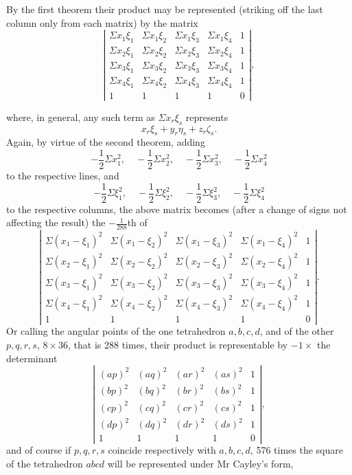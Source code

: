 \documentclass[11pt]{article}
\newcommand{\sourcepage}[1]{\marginpar{\scriptsize p.~#1}}
\begin{document}
{{By the first theorem their product may be represented (striking off the last column only from each matrix) by the matrix
\[
\left|\begin{array}{ccccc}
\Sigma x_1\xi_1&\Sigma x_1\xi_2&\Sigma x_1\xi_3&\Sigma x_1\xi_4&1\\
\Sigma x_2\xi_1&\Sigma x_2\xi_2&\Sigma x_2\xi_3&\Sigma x_2\xi_4&1\\
\Sigma x_3\xi_1&\Sigma x_3\xi_2&\Sigma x_3\xi_3&\Sigma x_3\xi_4&1\\
\Sigma x_4\xi_1&\Sigma x_4\xi_2&\Sigma x_4\xi_3&\Sigma x_4\xi_4&1\\
1&1&1&1&0
\end{array}\right|,
\]

\sourcepage{386}
where, in general, any such term as $\Sigma x_r\xi_s$ represents
\[
x_r\xi_s+y_r\eta_s+z_r\zeta_s.
\]
Again, by virtue of the second theorem, adding
\[
-\frac12\Sigma x_1^2,\quad -\frac12\Sigma x_2^2,\quad
-\frac12\Sigma x_3^2,\quad -\frac12\Sigma x_4^2
\]
to the respective lines, and
\[
-\frac12\Sigma \xi_1^2,\quad -\frac12\Sigma \xi_2^2,\quad
-\frac12\Sigma \xi_3^2,\quad -\frac12\Sigma \xi_4^2
\]
to the respective columns, the above matrix becomes (after a change of signs not affecting the result) the $-\frac1{288}$th of
\[
\left|\begin{array}{ccccc}
\Sigma(x_1-\xi_1)^2&\Sigma(x_1-\xi_2)^2&\Sigma(x_1-\xi_3)^2&\Sigma(x_1-\xi_4)^2&1\\
\Sigma(x_2-\xi_1)^2&\Sigma(x_2-\xi_2)^2&\Sigma(x_2-\xi_3)^2&\Sigma(x_2-\xi_4)^2&1\\
\Sigma(x_3-\xi_1)^2&\Sigma(x_3-\xi_2)^2&\Sigma(x_3-\xi_3)^2&\Sigma(x_3-\xi_4)^2&1\\
\Sigma(x_4-\xi_1)^2&\Sigma(x_4-\xi_2)^2&\Sigma(x_4-\xi_3)^2&\Sigma(x_4-\xi_4)^2&1\\
1&1&1&1&0
\end{array}\right|.
\]
Or calling the angular points of the one tetrahedron $a,b,c,d$, and of the other $p,q,r,s$, $8\times36$, that is 288 times, their product is representable by $-1\times$ the determinant
\[
\left|\begin{array}{ccccc}
(ap)^2&(aq)^2&(ar)^2&(as)^2&1\\
(bp)^2&(bq)^2&(br)^2&(bs)^2&1\\
(cp)^2&(cq)^2&(cr)^2&(cs)^2&1\\
(dp)^2&(dq)^2&(dr)^2&(ds)^2&1\\
1&1&1&1&0
\end{array}\right|,
\]
and of course if $p,q,r,s$ coincide respectively with $a,b,c,d$, 576 times the square of the tetrahedron $abcd$ will be represented under Mr Cayley's form,
}}
\end{document}

